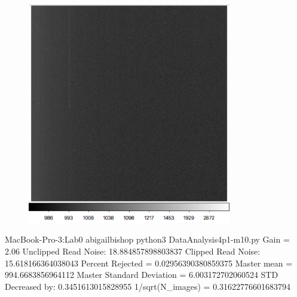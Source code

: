 \documentclass[preprint]{aastex62}
\begin{document}
    
        \begin{figure}
          \centering
            \includegraphics[width=3.5in]{../images/neg10BIAS_master.png}
            \caption{}
          \label{fig:neg10BIAS_master}
        \end{figure}
    
    MacBook-Pro-3:Lab0 abigailbishop python3 DataAnalysis4p1-m10.py 
    Gain =  2.06
    Unclipped Read Noise:  18.884857898803837
    Clipped Read Noise:  15.618166364038043
    Percent Rejected = 0.02956390380859375
    Master mean =  994.6683856964112
    Master Standard Deviation =  6.003172702060524
    STD Decreased by:  0.3451613015828955
    1/sqrt(N\_images) =  0.31622776601683794
    
    
    
\end{document}

